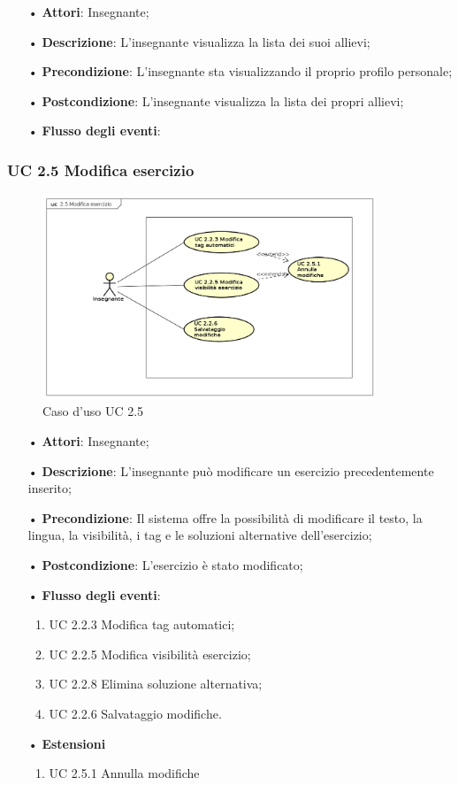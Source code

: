 \begin{itemize}
	\item[•] \textbf{Attori}: Insegnante;
	\item[•] \textbf{Descrizione}: L’insegnante visualizza la lista dei suoi allievi;
	\item[•] \textbf{Precondizione}: L'insegnante sta visualizzando il proprio profilo personale;
	\item[•] \textbf{Postcondizione}: L’insegnante visualizza la lista dei propri allievi;
	\item[•] \textbf{Flusso degli eventi}:
\end{itemize}


\subsubsection{UC 2.5 Modifica esercizio}
\begin{figure}[H]
\centering
\includegraphics[width=10cm]{img/UC25.png} 
\caption{Caso d'uso UC 2.5}
\end{figure}

\begin{itemize}
	\item[•] \textbf{Attori}: Insegnante;
	\item[•] \textbf{Descrizione}: L’insegnante può modificare un esercizio precedentemente inserito;
	\item[•] \textbf{Precondizione}: Il sistema offre la possibilità di modificare il testo, la
				lingua, la visibilità, i {tag} e le soluzioni alternative 
				dell’esercizio;
	\item[•] \textbf{Postcondizione}: L’esercizio è stato modificato;
	\item[•] \textbf{Flusso degli eventi}:
		\begin{enumerate}
			\item UC 2.2.3 Modifica {tag} automatici;
			\item UC 2.2.5 Modifica visibilità esercizio;
			\item UC 2.2.8 Elimina soluzione alternativa;
			\item UC 2.2.6 Salvataggio modifiche.
		\end{enumerate}
	\item[•] \textbf{Estensioni}
	\begin{enumerate}
		\item UC 2.5.1 Annulla modifiche 
	\end{enumerate}
\end{itemize}   

